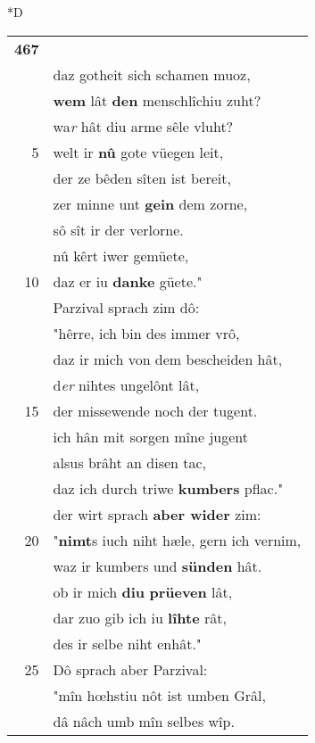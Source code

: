 \documentclass[8pt,a4paper,notitlepage]{article}
\begin{document}
\begin{table}[ht]
\begin{minipage}[t]{0.5\linewidth}
\small
\begin{center}*D
\end{center}
\begin{tabular}{rl}
\textbf{467} & \textbf{\begin{large}S\end{large}wâ} werc \textbf{verwürkent} sînen gruoz,\\ 
 & daz gotheit sich schamen muoz,\\ 
 & \textbf{wem} lât \textbf{den} menschlîchiu zuht?\\ 
 & wa\textit{r} hât diu arme sêle vluht?\\ 
5 & welt ir \textbf{nû} gote vüegen leit,\\ 
 & der ze bêden sîten ist bereit,\\ 
 & zer minne unt \textbf{gein} dem zorne,\\ 
 & sô sît ir der verlorne.\\ 
 & nû kêrt iwer gemüete,\\ 
10 & daz er iu \textbf{danke} güete."\\ 
 & Parzival sprach zim dô:\\ 
 & "hêrre, ich bin des immer vrô,\\ 
 & daz ir mich von dem bescheiden hât,\\ 
 & d\textit{er} nihtes ungelônt lât,\\ 
15 & der missewende noch der tugent.\\ 
 & ich hân mit sorgen mîne jugent\\ 
 & alsus brâht an disen tac,\\ 
 & daz ich durch triwe \textbf{kumbers} pflac."\\ 
 & der wirt sprach \textbf{aber wider} zim:\\ 
20 & "\textbf{nimt}s iuch niht hæle, gern ich vernim,\\ 
 & waz ir kumbers und \textbf{sünden} hât.\\ 
 & ob ir mich \textbf{diu} \textbf{prüeven} lât,\\ 
 & dar zuo gib ich iu \textbf{lîhte} rât,\\ 
 & des ir selbe niht enhât."\\ 
25 & Dô sprach aber Parzival:\\ 
 & "mîn hœhstiu nôt ist umben Grâl,\\ 
 & dâ nâch umb mîn selbes wîp.\\ 

\end{tabular}
\end{minipage}
\end{table}
\end{document}
